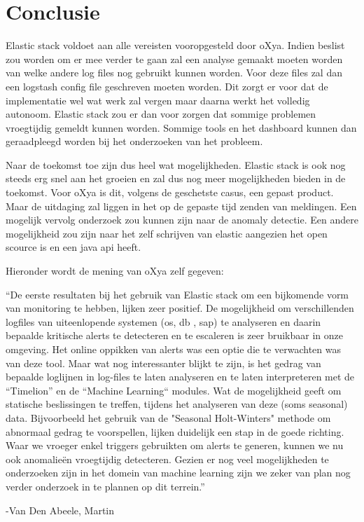 
\chapter{Conclusie}
\label{ch:conclusie}

Elastic stack voldoet aan alle vereisten vooropgesteld door oXya. Indien beslist zou worden om er mee verder te gaan zal een analyse gemaakt moeten worden van welke andere log files nog gebruikt kunnen worden. Voor deze files zal dan een logstash config file geschreven moeten worden. 
Dit zorgt er voor dat de implementatie wel wat werk zal vergen maar daarna werkt het volledig autonoom. Elastic stack zou er dan voor zorgen dat sommige problemen vroegtijdig gemeldt kunnen worden. Sommige tools en het dashboard kunnen dan geraadpleegd worden bij het onderzoeken van het probleem.

Naar de toekomst toe zijn dus heel wat mogelijkheden. Elastic stack is ook nog steeds erg snel aan het groeien en zal dus nog meer mogelijkheden bieden in de toekomst. Voor oXya is dit, volgens de geschetste casus, een gepast product. Maar de uitdaging zal liggen in het op de gepaste tijd zenden van meldingen.
Een mogelijk vervolg onderzoek zou kunnen zijn naar de anomaly detectie.
Een andere mogelijkheid zou zijn naar het zelf schrijven van elastic aangezien het open scource is en een java api heeft.

Hieronder wordt de mening van oXya zelf gegeven:


	``De eerste resultaten bij het gebruik van Elastic stack om een bijkomende vorm van monitoring te hebben, lijken zeer positief. 
	De mogelijkheid om verschillenden logfiles van uiteenlopende systemen (os, db , sap) te analyseren en daarin bepaalde kritische alerts te detecteren en te escaleren is zeer bruikbaar in onze omgeving. 
	Het online oppikken van alerts was een optie die te verwachten was van deze tool. 
	Maar wat nog interessanter blijkt te zijn, is het gedrag van bepaalde loglijnen in log-files te laten analyseren en te laten interpreteren met de “Timelion” en de “Machine Learning“ modules.
	Wat de mogelijkheid geeft om statische beslissingen te treffen, tijdens het analyseren van deze (soms seasonal) data. 
	Bijvoorbeeld het gebruik van de "Seasonal Holt-Winters" methode om abnormaal gedrag te voorspellen, lijken duidelijk een stap in de goede richting. 
	Waar we vroeger enkel triggers gebruikten om alerts te generen, kunnen we nu ook anomalieën vroegtijdig detecteren. 
	Gezien er nog veel mogelijkheden te onderzoeken zijn in het domein van machine learning zijn we zeker van plan nog verder onderzoek in te plannen op dit terrein.''
	\begin{flushright} 
		-Van Den Abeele, Martin
    \end{flushright}

